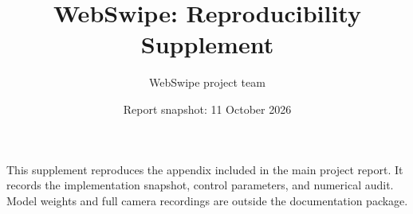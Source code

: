 \documentclass[11pt,a4paper]{article}
\title{WebSwipe: Reproducibility Supplement}
\author{WebSwipe project team}
\date{Report snapshot: 11 October 2026}
\begin{document}
\maketitle
This supplement reproduces the appendix included in the main project report. It records the implementation snapshot, control parameters, and numerical audit. Model weights and full camera recordings are outside the documentation package.
\newcommand{\suppsection}{\section}

\end{document}
